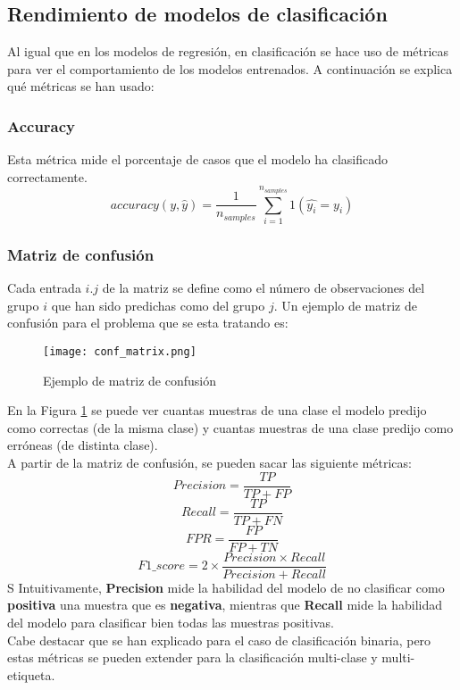 \subsection{Rendimiento de modelos de clasificación}
\label{metric:class}
Al igual que en los modelos de regresión, en clasificación se hace uso de métricas para ver el comportamiento de los modelos entrenados. A continuación se explica qué métricas se han usado:
\subsubsection*{Accuracy}
Esta métrica mide el porcentaje de casos que el modelo ha clasificado correctamente.
\[accuracy(y,\hat{y})=\frac{1}{n_{samples}}\sum_{i=1}^{n_{samples}}1(\hat{y_i}=y_i)\]
\subsubsection*{Matriz de confusión}
Cada entrada $i.j$ de la matriz se define como el número de observaciones del grupo $i$ que han sido predichas como del grupo $j$. Un ejemplo de matriz de confusión para el problema que se esta tratando es:
\begin{figure}[H]
	\centering
	\texttt{[image: conf\_matrix.png]}
	\caption{Ejemplo de matriz de confusión}
	\label{fig:conf_matrix}
\end{figure}
En la Figura \ref{fig:conf_matrix} se puede ver cuantas muestras de una clase el modelo predijo como correctas (de la misma clase) y cuantas muestras de una clase predijo como erróneas (de distinta clase).\\
\clearpage
A partir de la matriz de confusión, se pueden sacar las siguiente métricas:
\[Precision = \frac{TP} {TP + FP}\]
\[Recall = \frac{TP}{TP + FN}\]
\[FPR = \frac{FP}{FP + TN}\]
\[F1\_score = 2 \times \frac{Precision \times Recall}{Precision + Recall} \]S
Intuitivamente, \textbf{Precision} mide la habilidad del modelo de no clasificar como \textbf{positiva} una muestra que es \textbf{negativa}, mientras que \textbf{Recall} mide la habilidad del modelo para clasificar bien todas las muestras positivas.\\
\linebreak
Cabe destacar que se han explicado para el caso de clasificación binaria, pero estas métricas se pueden extender para la clasificación multi-clase y multi-etiqueta.
